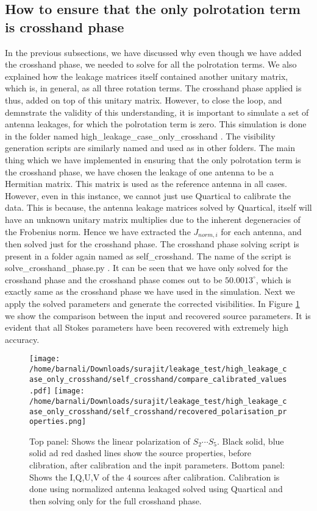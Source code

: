 \documentclass{article}
\begin{document}
\subsection{How to ensure that the only polrotation term is crosshand phase}

In the previous subsections, we have discussed why even though we have added the crosshand phase, we needed to solve for all the polrotation terms. We also explained how the leakage matrices itself contained another unitary matrix, which is, in general, as all three rotation terms. The crosshand phase applied is thus, added on top of this unitary matrix. However, to close the loop, and demnstrate the validity of this understanding, it is important to simulate a set of antenna leakages, for which the polrotation term is zero. This simulation is done in the folder named high\_leakage\_case\_only\_crosshand . The visibility generation scripts are similarly named and used as in other folders. The main thing which we have implemented in ensuring that the only polrotation term is the crosshand phase, we have chosen the leakage of one antenna to be a Hermitian matrix. This matrix is used as the reference antenna in all cases.  However, even in this instance, we cannot just use Quartical to calibrate the data. This is because, the antenna leakage matrices solved by Quartical, itself will have an unknown unitary matrix multiplies due to the inherent degeneracies of the Frobenius norm. Hence we have extracted the $J_{norm,i}$ for each antenna, and then solved just for the crosshand phase. The crosshand phase solving script is present in a folder again named as self\_crosshand. The name of the script is solve\_crosshand\_phase.py . It can be seen that we have only solved for the crosshand phase and the crosshand phase comes out to be $50.0013^\circ$, which is exactly same as the crosshand phase we have used in the simulation. Next we apply the solved parameters and generate the corrected visibilities.  In Figure \ref{fig:compare_input_output_source_params_self_crosshand_high_leak_crosshand} we show the comparison between the input and recovered source parameters. It is evident that all Stokes parameters have been recovered with extremely high accuracy.

\begin{figure}
\centering
\texttt{[image: /home/barnali/Downloads/surajit/leakage\_test/high\_leakage\_case\_only\_crosshand/self\_crosshand/compare\_calibrated\_values.pdf]}
\texttt{[image: /home/barnali/Downloads/surajit/leakage\_test/high\_leakage\_case\_only\_crosshand/self\_crosshand/recovered\_polarisation\_properties.png]}
\caption{Top panel: Shows the linear polarization of $S_2\cdots S_5$. Black solid, blue solid ad red dashed lines show the source properties, before clibration, after calibration and the inpit parameters. Bottom panel: Shows the I,Q,U,V of the 4 sources after calibration. Calibration is done using normalized antenna leakaged solved using Quartical and then solving only for the full crosshand phase.}
\label{fig:compare_input_output_source_params_self_crosshand_high_leak_crosshand}
\end{figure}
\end{document}
